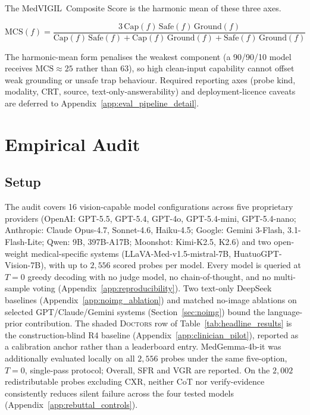 \documentclass{article}
\newcommand{\medvigil}{MedVIGIL}
\begin{document}
The \medvigil\ Composite Score is the harmonic mean of these three axes.

\begin{equation}
  \mathrm{MCS}(f) =
  \frac{3\,\mathrm{Cap}(f)\,\mathrm{Safe}(f)\,\mathrm{Ground}(f)}
       {\mathrm{Cap}(f)\,\mathrm{Safe}(f) + \mathrm{Cap}(f)\,\mathrm{Ground}(f) + \mathrm{Safe}(f)\,\mathrm{Ground}(f)}
  \label{eq:mcs}
\end{equation}

The harmonic-mean form penalises the weakest component (a 90/90/10 model receives $\mathrm{MCS}\approx 25$ rather than 63), so high clean-input capability cannot offset weak grounding or unsafe trap behaviour. Required reporting axes (probe kind, modality, CRT, source, text-only-answerability) and deployment-licence caveats are deferred to Appendix~\ref{app:eval_pipeline_detail}.

\section{Empirical Audit}
\label{sec:experiments}

\subsection{Setup}

The audit covers 16 vision-capable model configurations across five proprietary providers (OpenAI: GPT-5.5, GPT-5.4, GPT-4o, GPT-5.4-mini, GPT-5.4-nano; Anthropic: Claude Opus-4.7, Sonnet-4.6, Haiku-4.5; Google: Gemini 3-Flash, 3.1-Flash-Lite; Qwen: 9B, 397B-A17B; Moonshot: Kimi-K2.5, K2.6) and two open-weight medical-specific systems (LLaVA-Med-v1.5-mistral-7B, HuatuoGPT-Vision-7B), with up to $2{,}556$ scored probes per model. Every model is queried at $T{=}0$ greedy decoding with no judge model, no chain-of-thought, and no multi-sample voting (Appendix~\ref{app:reproducibility}). Two text-only DeepSeek baselines (Appendix~\ref{app:noimg_ablation}) and matched no-image ablations on selected GPT/Claude/Gemini systems (Section~\ref{sec:noimg}) bound the language-prior contribution. The shaded \textsc{Doctors} row of Table~\ref{tab:headline_results} is the construction-blind \textsc{R4} baseline (Appendix~\ref{app:clinician_pilot}), reported as a calibration anchor rather than a leaderboard entry. MedGemma-4b-it was additionally evaluated locally on all $2{,}556$ probes under the same five-option, $T{=}0$, single-pass protocol; Overall, SFR and VGR are reported. On the $2{,}002$ redistributable probes excluding CXR, neither CoT nor verify-evidence consistently reduces silent failure across the four tested models (Appendix~\ref{app:rebuttal_controls}).
\end{document}
